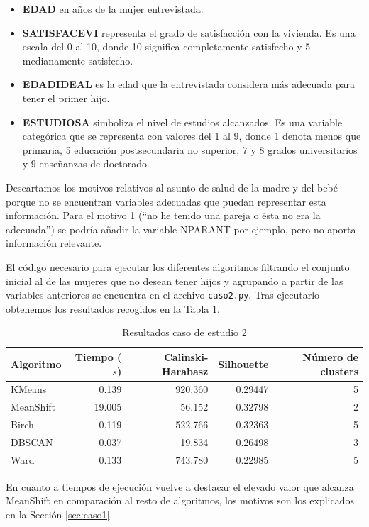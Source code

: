 \documentclass[a4paper, 20pt]{article}
\begin{document}
\begin{itemize}
\item \textbf{EDAD} en años de la mujer entrevistada.
\item \textbf{SATISFACEVI} representa el grado de satisfacción con la vivienda. Es una escala del 0 al 10, donde 10 significa completamente satisfecho y 5 medianamente satisfecho.
\item \textbf{EDADIDEAL} es la edad que la entrevistada considera más adecuada para tener el primer hijo.
\item \textbf{ESTUDIOSA} simboliza el nivel de estudios alcanzados. Es una variable categórica que se representa con valores del 1 al 9, donde 1 denota menos que primaria, 5 educación postsecundaria no superior, 7 y 8 grados universitarios y 9 enseñanzas de doctorado.
\end{itemize}

Descartamos los motivos relativos al asunto de salud de la madre y del bebé porque no se encuentran variables adecuadas que puedan representar esta información. Para el motivo 1 (``no he tenido una pareja o ésta no era la adecuada'') se podría añadir la variable NPARANT por ejemplo, pero no aporta información relevante.

El código necesario para ejecutar los diferentes algoritmos filtrando el conjunto inicial al de las mujeres que no desean tener hijos y agrupando a partir de las variables anteriores se encuentra en el archivo \texttt{caso2.py}. Tras ejecutarlo obtenemos los resultados recogidos en la Tabla \ref{tab:algorithms2}.

\begin{table}[H]
\centering
\caption{Resultados caso de estudio 2}
\label{tab:algorithms2}
\begin{tabular}{lrrrr}
\toprule
Algoritmo & Tiempo ($s$) & Calinski-Harabasz & Silhouette & Número de clusters\\
\midrule
KMeans & 0.139 & 920.360 & 0.29447 & 5 \\
MeanShift & 19.005 & 56.152 & 0.32798 & 2 \\
Birch & 0.119 & 522.766 & 0.32363 & 5 \\
DBSCAN & 0.037 & 19.834 & 0.26498 & 3 \\
Ward & 0.133 & 743.780 & 0.22985 & 5 \\
\bottomrule
\end{tabular}
\end{table}

En cuanto a tiempos de ejecución vuelve a destacar el elevado valor que alcanza MeanShift en comparación al resto de algoritmos, los motivos son los explicados en la Sección \ref{sec:caso1}.
\end{document}
